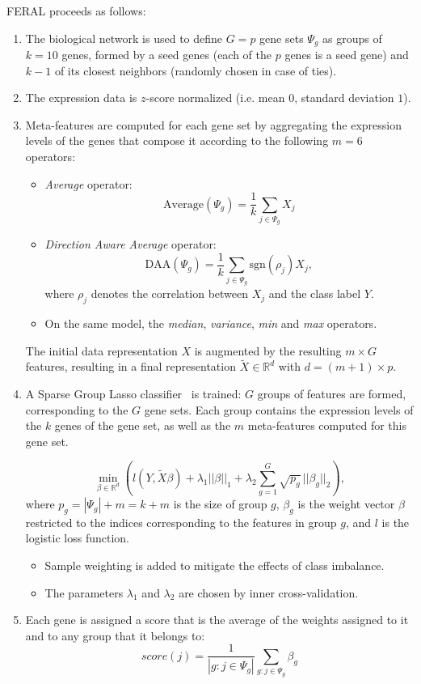 \documentclass[12pt,a4paper]{article}
\begin{document}
FERAL proceeds as follows:
\begin{enumerate}
\item The biological network is used to define $G=p$ gene sets $\Psi_g$ as groups of
  $k=10$ genes, formed by a seed genes (each of the $p$ genes is a seed gene) 
  and $k-1$ of its closest neighbors (randomly chosen in case of ties).  
\item The expression data is $z$-score normalized (i.e. mean $0$, standard deviation $1$).
\item Meta-features are computed for each gene set by 
  aggregating the expression levels of the genes that compose it
  according to the following $m=6$ operators:
  \begin{itemize}
  \item {\em Average} operator:  \[\mbox{Average}(\Psi_g) = \frac{1}{k} \sum_{j \in \Psi_g} X_j\]
  \item {\em Direction Aware Average} operator: 
    \[
    \mbox{DAA}(\Psi_g) = \frac{1}{k} \sum_{j \in \Psi_g}  \mbox{sgn}(\rho_j) X_j,
    \]
    where $\rho_j$ denotes the correlation between $X_j$ and the class label $Y$.
  \item On the same model, the {\em median}, {\em variance}, {\em min} and {\em max} operators.
  \end{itemize}

  The initial data representation $X$ is augmented by the resulting $m \times G$ features, 
  resulting in a final representation $\tilde X \in \mathbb{R}^d$ with $d=(m+1) \times p$.

\item A Sparse Group Lasso classifier~\cite{friedman2010} is trained:
  $G$ groups of features are formed, corresponding to the $G$ gene sets. 
  Each group contains the expression levels of the $k$ genes of the gene set, 
  as well as the $m$ meta-features computed for this gene set. 

  \[
  \min_{\beta \in \mathbb{R}^d} \left( l(Y, \tilde X  \beta) + \lambda_1 || \beta||_1 + 
  \lambda_2 \sum_{g=1}^G \sqrt{p_g}\, ||\beta_g||_2 \right),
  \]
  where $p_g = |\Psi_g|+m = k+m$ is the size of group $g$, 
  $\beta_g$ is the weight vector $\beta$ restricted to the indices 
  corresponding to the features in group  $g$, and $l$ is the logistic loss function.

  \begin{itemize}
  \item Sample weighting is added to mitigate the effects of class imbalance.
  \item The parameters $\lambda_1$ and $\lambda_2$ are chosen by inner cross-validation.
  \end{itemize}
\item Each gene is assigned a score that is the average of the weights assigned to it and to any group that it belongs to:
  \[
  score(j) = \frac{1}{|g: j \in \Psi_g|} \sum_{g: j \in \Psi_g} \beta_g
  \]
\end{enumerate}
\end{document}
